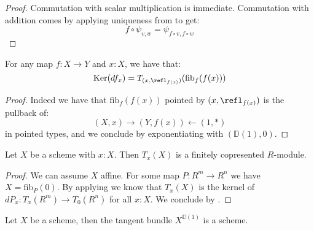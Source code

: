 \begin{proof}
Commutation with scalar multiplication is immediate. Commutation with addition comes by applying uniqueness from  to get:
\[f\circ \psi_{v,w} = \psi_{f\circ v,f\circ w}\]
\end{proof}

\begin{lemma}\label{kernel-is-tangent-of-fibers}
For any map $f:X\to Y$ and $x:X$, we have that:
\[
\mathrm{Ker}(df_x) = T_{(x,\refl_{f(x)})}(\mathrm{fib}_f(f(x)))
\]
\end{lemma}

\begin{proof}
Indeed we have that $\mathrm{fib}_f(f(x))$ pointed by $(x,\refl_{f(x)})$ is the pullback of:
\[
(X,x) \to (Y,f(x)) \leftarrow (1,*)
\]
in pointed types, and we conclude by exponentiating with $(\mathbb{D}(1),0)$.
\end{proof}

\begin{lemma}\label{tangent-finite-copresented}
Let $X$ be a scheme with $x : X$. Then $T_x(X)$ is a finitely
copresented $R$-module.
\end{lemma}

\begin{proof}
We can assume $X$ affine. For some map $P: R^m\to R^n$ we have $X=\mathrm{fib}_P(0)$.
By applying  we know that $T_x(X)$ is the kernel of $dP_x : T_x(R^m)\to T_0(R^n)$ for all $x:X$.
We conclude by .
\end{proof}

\begin{corollary}
  \label{tangent-bundle-scheme}
  Let $X$ be a scheme, then the tangent bundle $X^{\mathbb{D}(1)}$ is a scheme.
\end{corollary}

